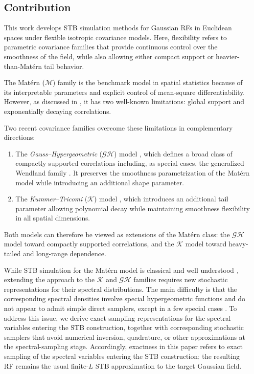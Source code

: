 \documentclass[
  12pt]{article}
\begin{document}
\subsection{Contribution}

This work develops STB simulation methods for Gaussian RFs in Euclidean spaces under flexible isotropic covariance models.
Here, flexibility refers to parametric covariance families that provide continuous control over the smoothness of the field, while also allowing either compact support or heavier-than-Mat\'ern tail behavior.

The Mat\'ern ($\mathcal{M}$) family \citep{Stein:1999,mateporcu} is the benchmark model in spatial statistics because of its interpretable parameters and explicit control of mean-square differentiability.
However, as discussed in \citet{mateporcu}, it has two well-known limitations:
global support and exponentially decaying correlations.

Two recent covariance families overcome these limitations in complementary directions:
\begin{enumerate}
\item The \emph{Gauss--Hypergeometric} ($\mathcal{GH}$) model \citep{emery2022gauss,hyp2025}, which defines a broad class of compactly supported correlations including, as special cases, the generalized Wendland family \citep{gnei02,BFFP}.
It preserves the smoothness parametrization of the Mat\'ern model while introducing an additional shape parameter.

\item The \emph{Kummer--Tricomi} ($\mathcal{K}$) model \citep{ma2022beyond}, which introduces an additional tail parameter allowing polynomial decay while maintaining smoothness flexibility in all spatial dimensions.
\end{enumerate}

Both models can therefore be viewed as extensions of the Mat\'ern class:
the $\mathcal{GH}$ model toward compactly supported correlations, and the $\mathcal{K}$ model toward heavy-tailed and long-range dependence.

While STB simulation for the Mat\'ern model is classical and well understood \citep{EmeryLantu2006}, extending the approach to the $\mathcal{K}$ and $\mathcal{GH}$ families requires new stochastic representations for their spectral distributions.
The main difficulty is that the corresponding spectral densities involve special hypergeometric functions and do not appear to admit simple direct samplers, except in a few special cases \citep[e.g.,][]{arroyo2021}.
To address this issue, we derive exact sampling representations for the spectral variables entering the STB construction, together with corresponding stochastic samplers that avoid numerical inversion, quadrature, or other approximations at the spectral-sampling stage.
Accordingly, exactness in this paper refers to exact sampling of the spectral variables entering the STB construction; the resulting RF remains the usual finite-$L$ STB approximation to the target Gaussian field.
\end{document}
